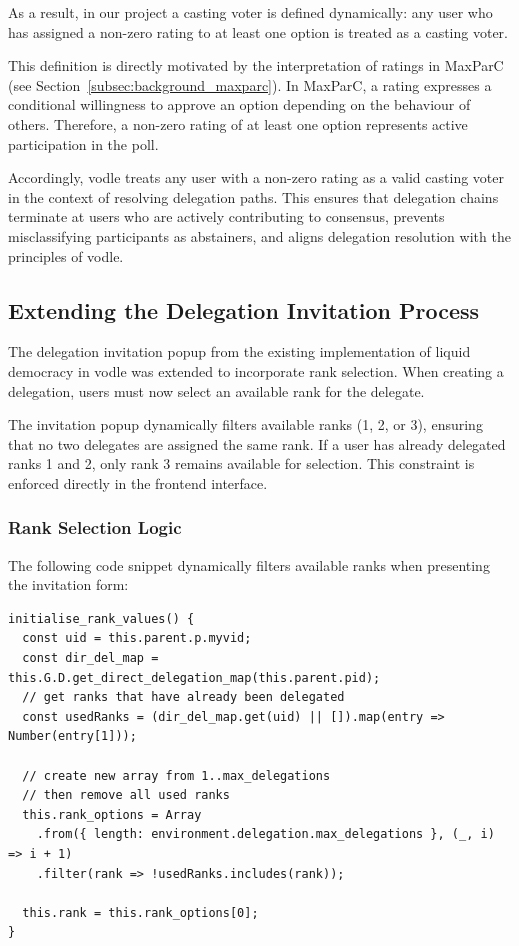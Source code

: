 As a result, in our project a casting voter is defined dynamically: any user who has assigned a non-zero rating to at least one option is treated as a casting voter.

This definition is directly motivated by the interpretation of ratings in MaxParC (see Section~\ref{subsec:background_maxparc}). In MaxParC, a rating expresses a conditional willingness to approve an option depending on the behaviour of others. Therefore, a non-zero rating of at least one option represents active participation in the poll.

Accordingly, vodle treats any user with a non-zero rating as a valid casting voter in the context of resolving delegation paths. This ensures that delegation chains terminate at users who are actively contributing to consensus, prevents misclassifying participants as abstainers, and aligns delegation resolution with the principles of vodle. 

\subsection{Extending the Delegation Invitation Process}

The delegation invitation popup from the existing implementation of liquid democracy in vodle was extended to incorporate rank selection. When creating a delegation, users must now select an available rank for the delegate.

The invitation popup dynamically filters available ranks (1, 2, or 3), ensuring that no two delegates are assigned the same rank. If a user has already delegated ranks 1 and 2, only rank 3 remains available for selection. This constraint is enforced directly in the frontend interface.

\subsubsection{Rank Selection Logic}

The following code snippet dynamically filters available ranks when presenting the invitation form:

\begin{verbatim}
initialise_rank_values() {
  const uid = this.parent.p.myvid;
  const dir_del_map = this.G.D.get_direct_delegation_map(this.parent.pid);
  // get ranks that have already been delegated
  const usedRanks = (dir_del_map.get(uid) || []).map(entry => Number(entry[1]));

  // create new array from 1..max_delegations
  // then remove all used ranks
  this.rank_options = Array
    .from({ length: environment.delegation.max_delegations }, (_, i) => i + 1)
    .filter(rank => !usedRanks.includes(rank));

  this.rank = this.rank_options[0];
}
\end{verbatim}

